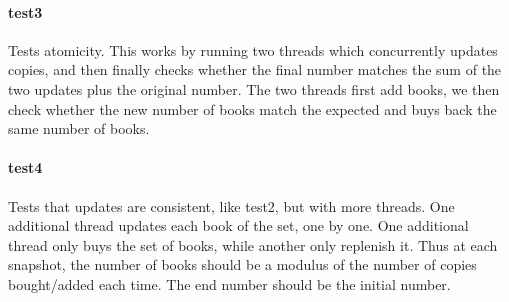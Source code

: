 \documentclass[a4paper, 11pt]{article}
\begin{document}
\paragraph{test3} %
\label{par:test3}

Tests atomicity. This works by running two threads which concurrently updates copies, and then finally checks whether the final number matches the sum of the two updates plus the original number. The two threads first add books, we then check whether the new number of books match the expected and buys back the same number of books.


\paragraph{test4} %
\label{par:test4}

Tests that updates are consistent, like test2, but with more threads. One additional thread updates each book of the set, one by one. One additional thread only buys the set of books, while another only replenish it. Thus at each snapshot, the number of books should be a modulus of the number of copies bought/added each time. The end number should be the initial number.


\end{document}
